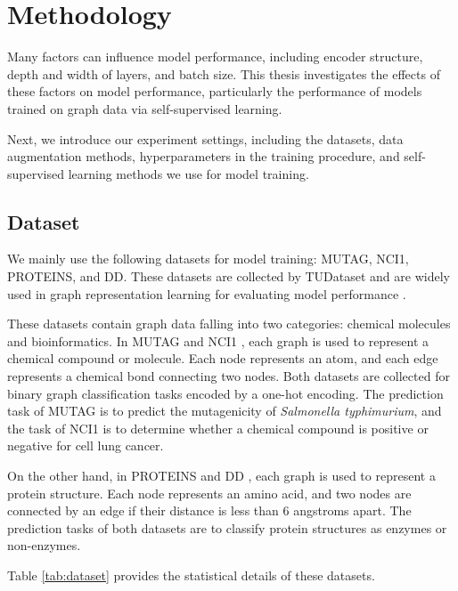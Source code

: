 
\chapter{Methodology}

Many factors can influence model performance, including encoder structure, depth and width of layers, and batch size. This thesis investigates the effects of these factors on model performance, particularly the performance of models trained on graph data via self-supervised learning. 

Next, we introduce our experiment settings, including the datasets, data augmentation methods, hyperparameters in the training procedure, and self-supervised learning methods we use for model training.

\section{Dataset}

We mainly use the following datasets for model training: MUTAG, NCI1, PROTEINS, and DD. These datasets are collected by TUDataset \cite{tudataset} and are widely used in graph representation learning for evaluating model performance \cite{benchmarking}. 

These datasets contain graph data falling into two categories: chemical molecules and bioinformatics. In MUTAG \cite{mutag} and NCI1 \cite{nci1}, each graph is used to represent a chemical compound or molecule. Each node represents an atom, and each edge represents a chemical bond connecting two nodes. Both datasets are collected for binary graph classification tasks encoded by a one-hot encoding. The prediction task of MUTAG is to predict the mutagenicity of \textit{Salmonella typhimurium}, and the task of NCI1 is to determine whether a chemical compound is positive or negative for cell lung cancer.

On the other hand, in PROTEINS \cite{proteins} and DD \cite{proteins}, each graph is used to represent a protein structure. Each node represents an amino acid, and two nodes are connected by an edge if their distance is less than 6 angstroms apart. The prediction tasks of both datasets are to classify protein structures as enzymes or non-enzymes.

Table \ref{tab:dataset} provides the statistical details of these datasets.


